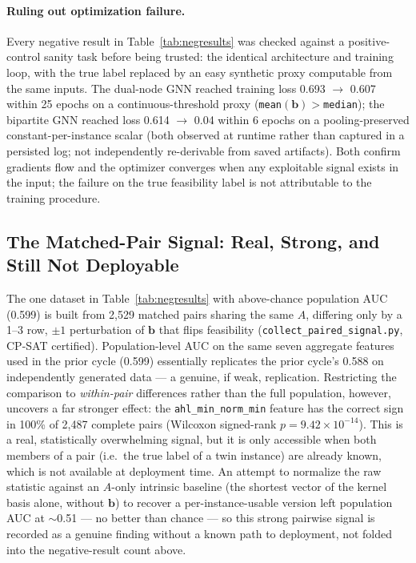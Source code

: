 \documentclass[12pt]{article}
\begin{document}
\paragraph{Ruling out optimization failure.} Every negative result in Table~\ref{tab:negresults} was checked against a positive-control sanity task before being trusted: the identical architecture and training loop, with the true label replaced by an easy synthetic proxy computable from the same inputs. The dual-node GNN reached training loss 0.693 $\to$ 0.607 within 25 epochs on a continuous-threshold proxy (\texttt{mean}$(\mathbf{b}) > $\texttt{median}); the bipartite GNN reached loss 0.614 $\to$ 0.04 within 6 epochs on a pooling-preserved constant-per-instance scalar (both observed at runtime rather than captured in a persisted log; not independently re-derivable from saved artifacts). Both confirm gradients flow and the optimizer converges when any exploitable signal exists in the input; the failure on the true feasibility label is not attributable to the training procedure.

\subsection{The Matched-Pair Signal: Real, Strong, and Still Not Deployable}
\label{sec:pairedsignal}

The one dataset in Table~\ref{tab:negresults} with above-chance population AUC (0.599) is built from 2{,}529 matched pairs sharing the same $A$, differing only by a 1--3 row, $\pm1$ perturbation of $\mathbf{b}$ that flips feasibility (\texttt{collect\_paired\_signal.py}, CP-SAT certified). Population-level AUC on the same seven aggregate features used in the prior cycle (0.599) essentially replicates the prior cycle's 0.588 on independently generated data --- a genuine, if weak, replication. Restricting the comparison to \emph{within-pair} differences rather than the full population, however, uncovers a far stronger effect: the \texttt{ahl\_min\_norm\_min} feature has the correct sign in 100\% of 2{,}487 complete pairs (Wilcoxon signed-rank $p = 9.42\times10^{-14}$). This is a real, statistically overwhelming signal, but it is only accessible when both members of a pair (i.e.\ the true label of a twin instance) are already known, which is not available at deployment time. An attempt to normalize the raw statistic against an $A$-only intrinsic baseline (the shortest vector of the kernel basis alone, without $\mathbf{b}$) to recover a per-instance-usable version left population AUC at $\sim$0.51 --- no better than chance --- so this strong pairwise signal is recorded as a genuine finding without a known path to deployment, not folded into the negative-result count above.
\end{document}
